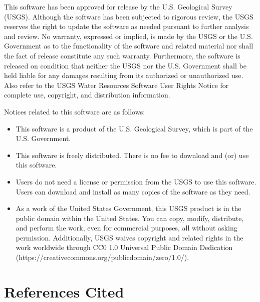 \documentclass[11pt,twoside,twocolumn]{usgsreport}
\begin{document}
This software has been approved for release by the U.S. Geological Survey (USGS). Although the software has been subjected to rigorous review, the USGS reserves the right to update the software as needed pursuant to further analysis and review. No warranty, expressed or implied, is made by the USGS or the U.S. Government as to the functionality of the software and related material nor shall the fact of release constitute any such warranty. Furthermore, the software is released on condition that neither the USGS nor the U.S. Government shall be held liable for any damages resulting from its authorized or unauthorized use. Also refer to the USGS Water Resources Software User Rights Notice for complete use, copyright, and distribution information.

Notices related to this software are as follows:
\begin{itemize}
\item This software is a product of the U.S. Geological Survey, which is part of the U.S. Government.

\item This software is freely distributed. There is no fee to download and (or) use this software.

\item Users do not need a license or permission from the USGS to use this software. Users can download and install as many copies of the software as they need.

\item As a work of the United States Government, this USGS product is in the public domain within the United States. You can copy, modify, distribute, and perform the work, even for commercial purposes, all without asking permission. Additionally, USGS waives copyright and related rights in the work worldwide through CC0 1.0 Universal Public Domain Dedication (https://creativecommons.org/publicdomain/zero/1.0/).
\end{itemize}

\section{References Cited}
\end{document}
